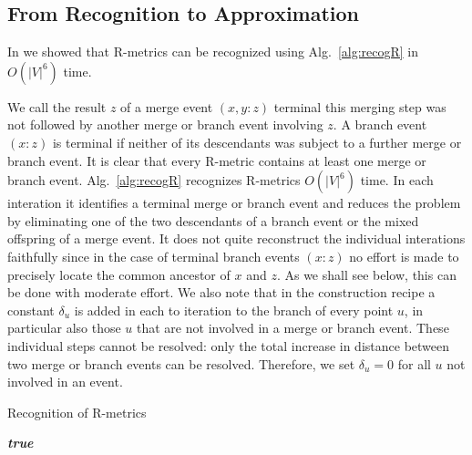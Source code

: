 \documentclass{article}
\begin{document}
\subsection{From Recognition to Approximation} 

In \cite{Prohaska:17a} we showed that R-metrics can be recognized using
Alg.~\ref{alg:recogR} in $O(|V|^6)$ time. 

We call the result $z$ of a merge event $(x,y:z)$ terminal this merging
step was not followed by another merge or branch event involving $z$. A
branch event $(x:z)$ is terminal if neither of its descendants was subject
to a further merge or branch event. It is clear that every R-metric
contains at least one merge or branch event. Alg.~\ref{alg:recogR}
\cite{Prohaska:17a} recognizes R-metrics $O(|V|^6)$ time. In each
interation it identifies a terminal merge or branch event and reduces the
problem by eliminating one of the two descendants of a branch event or the
mixed offspring of a merge event. It does not quite reconstruct the
individual interations faithfully since in the case of terminal branch
events $(x:z)$ no effort is made to precisely locate the common ancestor of
$x$ and $z$. As we shall see below, this can be done with moderate effort.
We also note that in the construction recipe a constant $\delta_u$ is added
in each to iteration to the branch of every point $u$, in particular also
those $u$ that are not involved in a merge or branch event. These
individual steps cannot be resolved: only the total increase in distance
between two merge or branch events can be resolved. Therefore, we set
$\delta_u=0$ for all $u$ not involved in an event. 

\begin{algorithm}[H]
\caption{Recognition of R-metrics}
\label{alg:recogR}
\SetAlgoLined

\Return \emph{\textbf{true}}
\end{algorithm}
\end{document}
